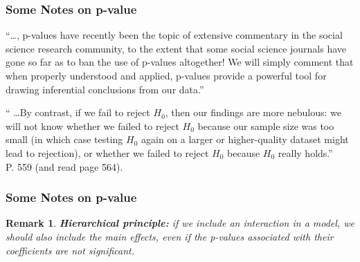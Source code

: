 \documentclass[serif, xcolor={dvipsnames}]{beamer} %
\newtheorem{rem}{Remark}
\begin{document}
\begin{frame}[t]
\frametitle{Some Notes on p-value}
\begin{tcolorbox}
``\dots, p-values have recently been the topic of 
extensive commentary in the social science research community, to the extent
that some social science journals have gone so far as to ban the use of
p-values altogether! We will simply comment that when properly 
understood and applied, p-values provide a powerful tool for drawing inferential
conclusions from our data.''
\end{tcolorbox}

\begin{tcolorbox}
`` \dots By contrast, if we fail to reject $H_0$,
then our findings are more nebulous: we will not know whether we failed
to reject $H_0$ because our sample size was too small (in which case testing
$H_0$ again on a larger or higher-quality dataset might lead to rejection), or
whether we failed to reject $H_0$ because $H_0$ really holds.'' \\P. 559 (and read page 564).
\end{tcolorbox}
\end{frame}
\begin{frame}[t]
\frametitle{Some Notes on p-value}
\begin{rem}
{\bf Hierarchical principle:} if we include an interaction in a model, we
should also include the main effects, even if the p-values associated with
their coefficients are not significant. 
\end{rem}
\end{frame}
\end{document}

